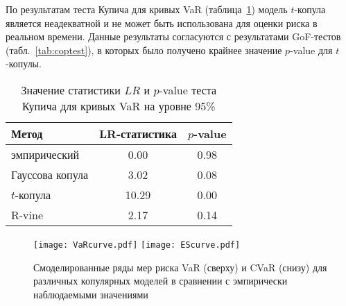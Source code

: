 По результатам теста Купича для кривых VaR (таблица~\ref{tab:kupiec}) модель $t$-копула является неадекватной и не может быть использована для оценки риска в реальном времени.
Данные результаты согласуются с результатами GoF-тестов (табл.~\ref{tab:coptest}), в которых было получено крайнее значение $p$-value для $t$-копулы.

\begin{table}[hbt!]
    \centering
    \caption{Значение статистики $LR$ и $p$-value теста Купича для кривых VaR на уровне 95\%}
    \label{tab:kupiec}
    \setlength{\tabcolsep}{10pt}
    \begin{tabular}{lcc} \toprule
        Метод & LR-статистика & $p$-value \\ \midrule
        эмпирический & 0.00 & 0.98 \\
        Гауссова копула & 3.02 & 0.08 \\
        $t$-копула & 10.29 & 0.00 \\
        R-vine & 2.17 & 0.14 \\ \bottomrule
    \end{tabular}
\end{table}


\begin{figure}[p]
    \centering
    \texttt{[image: VaRcurve.pdf]}
    \texttt{[image: EScurve.pdf]}
    \caption{Смоделированные ряды мер риска VaR (сверху) и CVaR (снизу)
    для различных копулярных моделей в сравнении с эмпирически наблюдаемыми значениями}
    \label{ris:VaR-ES-curve}
\end{figure}
